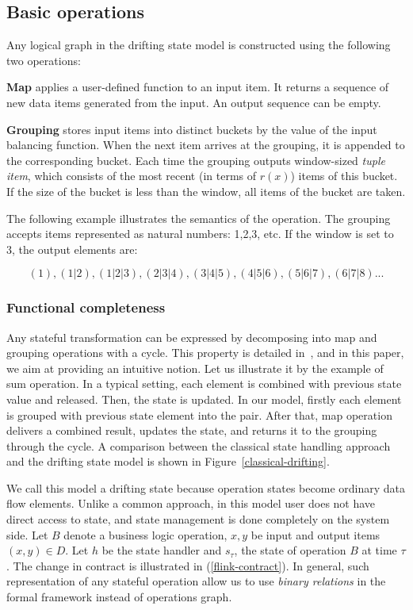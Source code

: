 \subsection{Basic operations}

Any logical graph in the drifting state model is constructed using the following two operations:

{\bf Map} applies a user-defined function to an input item. It returns a sequence of new data items generated from the input. An output sequence can be empty.

{\bf Grouping} stores input items into distinct buckets by the value of the input balancing function. When the next item arrives at the grouping, it is appended to the corresponding bucket. Each time the grouping outputs window-sized {\it tuple item}, which consists of the most recent (in terms of $r(x)$) items of this bucket. If the size of the bucket is less than the window, all items of the bucket are taken.

The following example illustrates the semantics of the operation. The grouping accepts items represented as natural numbers: 1,2,3, etc. If the window is set to 3, the output elements are:

\[(1), (1|2), (1|2|3), (2|3|4), (3|4|5), (4|5|6), (5|6|7), (6|7|8)...\]

\subsubsection{Functional completeness}

Any stateful transformation can be expressed by decomposing into map and grouping operations with a cycle. This property is detailed in~\cite{we2018adbis}, and in this paper, we aim at providing an intuitive notion. Let us illustrate it by the example of sum operation. In a typical setting, each element is combined with previous state value and released. Then, the state is updated. In our model, firstly each element is grouped with previous state element into the pair. After that, map operation delivers a combined result, updates the state, and returns it to the grouping through the cycle. A comparison between the classical state handling approach and the drifting state model is shown in Figure~\ref{classical-drifting}.

We call this model a drifting state because operation states become ordinary data flow elements. Unlike a common approach, in this model user does not have direct access to state, and state management is done completely on the system side. Let $B$ denote a business logic operation, $x, y$ be input and output items $(x,y)\in D$. Let $h$ be the state handler and $s_\tau$, the state of operation $B$ at time $\tau$. The change in contract is illustrated in (\ref{flink-contract}). In general, such representation of any stateful operation allow us to use {\em binary relations} in the formal framework instead of operations graph.


